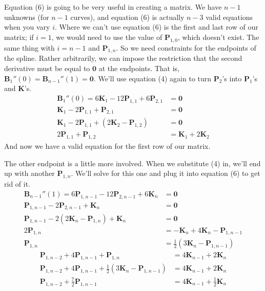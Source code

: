\documentclass[10pt]{article}
\renewcommand{\vec}[1]{\mathbf{#1}}
\begin{document}
	Equation (6) is going to be very useful in creating a matrix. We have $n-1$
	unknowns (for $n-1$ curves), and equation (6) is actually $n-3$ valid
	equations when you vary $i$. Where we can't use equation (6) is the first
	and last row of our matrix; if $i=1$, we would need to use the value of
	$\vec{P}_{1,0}$, which doesn't exist. The same thing with $i=n-1$ and
	$\vec{P}_{1,n}$. So we need constraints for the endpoints of the spline.
	Rather arbitrarily, we can impose the restriction that the second derivative
	must be equal to $\vec{0}$ at the endpoints. That is,
	$\vec{B}_{1}''(0) = \vec{B}_{n-1}''(1) = \vec{0}$. We'll use equation (4)
	again to turn $\vec{P}_{2}$'s into $\vec{P}_{1}$'s and $\vec{K}$'s.
	\begin{align}
		\vec{B}_{1}''(0) = 6\vec{K}_{1} - 12\vec{P}_{1,1} + 6\vec{P}_{2,1} &= \vec{0}\nonumber\\
		\vec{K}_{1} - 2\vec{P}_{1,1} + \vec{P}_{2,1} &= \vec{0}\nonumber\\
		\vec{K}_{1} - 2\vec{P}_{1,1} + (2\vec{K}_{2} - \vec{P}_{1,2}) &= \vec{0}\nonumber\\
		2\vec{P}_{1,1} + \vec{P}_{1,2} &= \vec{K}_{1} + 2\vec{K}_{2}
	\end{align}
	And now we have a valid equation for the first row of our matrix.

	The other endpoint is a little more involved. When we substitute (4) in,
	we'll end up with another $\vec{P}_{1,n}$. We'll solve for this one and plug
	it into equation (6) to get rid of it.
	\begin{align*}
		\vec{B}_{n-1}''(1) = 6\vec{P}_{1,n-1} - 12\vec{P}_{2,n-1} + 6\vec{K}_{n} &= \vec{0}\\
		\vec{P}_{1,n-1} - 2\vec{P}_{2,n-1} + \vec{K}_{n} &= \vec{0}\\
		\vec{P}_{1,n-1} - 2(2\vec{K}_{n} - \vec{P}_{1,n}) + \vec{K}_{n} &= \vec{0}\\
		2\vec{P}_{1,n} &= -\vec{K}_{n} + 4\vec{K}_{n} - \vec{P}_{1,n-1}\\
		\vec{P}_{1,n} &= \frac{1}{2}(3\vec{K}_{n} - \vec{P}_{1,n-1})
	\end{align*}
	\begin{align}
		\vec{P}_{1,n-2} + 4\vec{P}_{1,n-1} + \vec{P}_{1,n} &= 4\vec{K}_{n-1} + 2\vec{K}_{n}\nonumber\\
		\vec{P}_{1,n-2} + 4\vec{P}_{1,n-1} + \frac{1}{2}(3\vec{K}_{n} - \vec{P}_{1,n-1}) &= 4\vec{K}_{n-1} + 2\vec{K}_{n}\nonumber\\
		\vec{P}_{1,n-2} + \frac{7}{2}\vec{P}_{1,n-1} &= 4\vec{K}_{n-1} + \frac{1}{2}\vec{K}_{n}
	\end{align}
\end{document}
